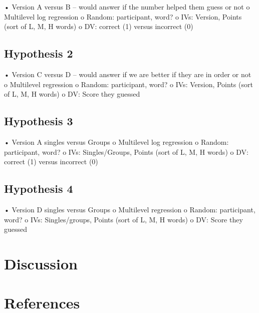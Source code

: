 \documentclass[man]{apa6}
\theoremstyle{definition}
\theoremstyle{definition}
\theoremstyle{definition}
\theoremstyle{remark}
\begin{document}
• Version A versus B -- would answer if the number helped them guess or
not o Multilevel log regression o Random: participant, word? o IVs:
Version, Points (sort of L, M, H words) o DV: correct (1) versus
incorrect (0)

\hypertarget{hypothesis-2}{%
\subsection{Hypothesis 2}\label{hypothesis-2}}

• Version C versus D -- would answer if we are better if they are in
order or not o Multilevel regression o Random: participant, word? o IVs:
Version, Points (sort of L, M, H words) o DV: Score they guessed

\hypertarget{hypothesis-3}{%
\subsection{Hypothesis 3}\label{hypothesis-3}}

• Version A singles versus Groups o Multilevel log regression o Random:
participant, word? o IVs: Singles/Groups, Points (sort of L, M, H words)
o DV: correct (1) versus incorrect (0)

\hypertarget{hypothesis-4}{%
\subsection{Hypothesis 4}\label{hypothesis-4}}

• Version D singles versus Groups o Multilevel regression o Random:
participant, word? o IVs: Singles/groups, Points (sort of L, M, H words)
o DV: Score they guessed

\hypertarget{discussion}{%
\section{Discussion}\label{discussion}}

\newpage

\hypertarget{references}{%
\section{References}\label{references}}

\begingroup
\setlength{\parindent}{-0.5in}
\setlength{\leftskip}{0.5in}

\hypertarget{refs}{}

\endgroup
\end{document}
